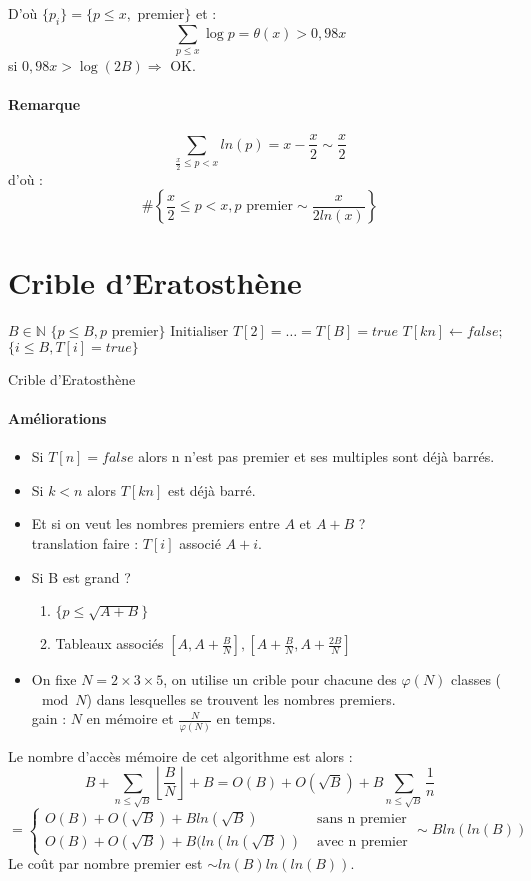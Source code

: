 \documentclass[12pt,a4paper]{report}
\begin{document}
  
D'où $\{p_i\} = \{p \leqslant x, \mbox{ premier}\}$ et : 
$$ \sum_{p\leqslant x} \log p = \theta(x) > 0,98 x $$
si $0,98 x > \log(2B) \Rightarrow $ OK.
\paragraph{Remarque\\}
$$ \sum_{\frac{x}{2}\leqslant p < x} ln(p) = x-\frac{x}{2} \sim \frac{x}{2} $$
d'où : 
$$ \#\left\{\frac{x}{2} \leqslant p < x, p \mbox{ premier} \sim \frac{x}{2ln(x)}\right\}$$
\section{Crible d'Eratosthène}
\begin{algorithm}[h!]
\begin{algorithmic}[1]
\REQUIRE $B \in \mathbb{N}$
\ENSURE $\{p \leqslant B, p \mbox{ premier}\}$
\STATE Initialiser $T[2] = \ldots = T[B] = true$
\STATE $T[kn] \leftarrow false;$
\ENDFOR
\ENDFOR
\RETURN $\{i\leqslant B,T[i]=true\}$
\end{algorithmic}
\caption{Crible d'Eratosthène}
\end{algorithm}
\paragraph{Améliorations\\}
\begin{itemize}
\item Si $ T[n]= false$ alors n n'est pas premier et ses multiples sont déjà barrés.
\item Si $k<n$ alors $T[kn]$ est déjà barré.
\item Et si on veut les nombres premiers entre $A$ et $A+B$ ?\\
translation  faire : $T[i]$ associé  $A+i$.
\item Si B est grand ?
\begin{enumerate}
\item $\{p\leqslant \sqrt{A+B}\}$
\item Tableaux associés  $\left[A, A + \frac{B}{N}\right],\left[A + \frac{B}{N},A + \frac{2B}{N}\right]$
\end{enumerate}
\item On fixe $ N = 2\times 3 \times 5$, on utilise un crible pour chacune des $\varphi(N)$ classes ($\mod N$)  dans lesquelles se trouvent les nombres premiers.\\
gain : $N$ en mémoire et $\frac{N}{\varphi(N)}$ en temps.
\end{itemize}
Le nombre d'accès mémoire de cet algorithme est alors :
$$ B + \sum_{n \leqslant \sqrt{B}} \left\lfloor \frac{B}{N}\right\rfloor + B = 
O(B) + O(\sqrt{B})+B \sum_{n\leqslant \sqrt{B}} \frac{1}{n}$$
$$ = \left\{ \begin{array}{ll}
O(B) + O(\sqrt{B})+ B ln(\sqrt{B}) & \mbox{ sans n premier} \\
O(B) + O(\sqrt{B})+ B (ln(ln(\sqrt{B})) & \mbox{ avec n premier} \end{array}\right. \sim Bln(ln( B)) $$
Le coût par nombre premier est $\sim ln(B)ln(ln(B))$.
\end{document}
